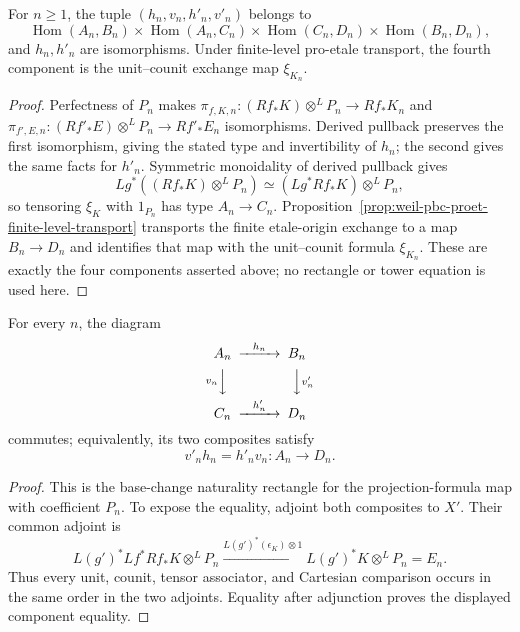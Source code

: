 \begin{lemma}
\label{lemma:weil-sf-well-defined-def-weil-pbc-level-map-arrows}
For $n\geq1$, the tuple $(h_n,v_n,h'_n,v'_n)$ belongs to
\[
 \operatorname{Hom}(A_n,B_n)\times
 \operatorname{Hom}(A_n,C_n)\times
 \operatorname{Hom}(C_n,D_n)\times
 \operatorname{Hom}(B_n,D_n),
\]
and $h_n,h'_n$ are isomorphisms.  Under finite-level pro-etale transport,
the fourth component is the unit--counit exchange map $\xi_{K_n}$.
\end{lemma}
\begin{proof}
Perfectness of $P_n$ makes
$\pi_{f,K,n}:(Rf_*K)\otimes^LP_n\to Rf_*K_n$ and
$\pi_{f',E,n}:(Rf'_*E)\otimes^LP_n\to Rf'_*E_n$ isomorphisms.
Derived pullback preserves the first isomorphism, giving the stated type and
invertibility of $h_n$; the second gives the same facts for $h'_n$.
Symmetric monoidality of derived pullback gives
\[
 Lg^*((Rf_*K)\otimes^LP_n)\simeq
 (Lg^*Rf_*K)\otimes^LP_n,
\]
so tensoring $\xi_K$ with $1_{P_n}$ has type $A_n\to C_n$.
Proposition~\ref{prop:weil-pbc-proet-finite-level-transport} transports the
finite etale-origin exchange to a map $B_n\to D_n$ and identifies that map
with the unit--counit formula $\xi_{K_n}$.  These are exactly the four
components asserted above; no rectangle or tower equation is used here.
\end{proof}
\begin{lemma}
\label{lemma:weil-pbc-level-map-rectangle}
For every $n$, the diagram
\[
\begin{CD}
 A_n @>{h_n}>> B_n\\
 @V{v_n}VV @VV{v'_n}V\\
 C_n @>{h'_n}>> D_n
\end{CD}
\]
commutes; equivalently, its two composites satisfy
\[
 v'_nh_n=h'_nv_n:A_n\longrightarrow D_n.
\]
\end{lemma}
\begin{proof}

This is the base-change naturality rectangle for the projection-formula map
with coefficient $P_n$.  To expose the equality, adjoint both composites to
$X'$.  Their common adjoint is
\[
 L(g')^*Lf^*Rf_*K\otimes^LP_n
 \xrightarrow{L(g')^*(\epsilon_K)\otimes1}
 L(g')^*K\otimes^LP_n=E_n.
\]
Thus every unit, counit, tensor associator, and Cartesian comparison occurs
in the same order in the two adjoints.  Equality after adjunction proves the
displayed component equality.
\end{proof}

